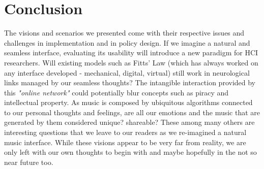 \documentclass[acmtog]{acmart}
\begin{document}
\section{Conclusion}
The visions and scenarios we presented come with their respective issues and challenges in implementation and in policy design. If we imagine a natural and seamless interface, evaluating its usability will introduce a new paradigm for HCI researchers. Will existing models such as Fitts' Law (which has always worked on any interface developed - mechanical, digital, virtual) still work in neurological links managed by our seamless thoughts? The intangible interaction provided by this \textit{"online network"} could potentially blur concepts such as piracy and intellectual property. As music is composed by ubiquitous algorithms connected to our personal thoughts and feelings, are all our emotions and the music that are generated by them considered unique? shareable? These among many others are interesting questions that we leave to our readers as we re-imagined a natural music interface. While these visions appear to be very far from reality, we are only left with our own thoughts to begin with and maybe hopefully in the not so near future too. 



\end{document}
